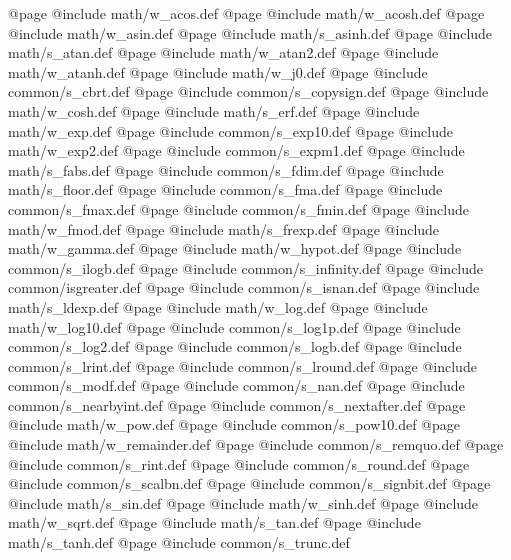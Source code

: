 @page
@include   math/w_acos.def
@page
@include   math/w_acosh.def
@page
@include   math/w_asin.def
@page
@include   math/s_asinh.def
@page
@include   math/s_atan.def
@page
@include   math/w_atan2.def
@page
@include   math/w_atanh.def
@page
@include   math/w_j0.def
@page
@include common/s_cbrt.def
@page
@include common/s_copysign.def
@page
@include   math/w_cosh.def
@page
@include   math/s_erf.def
@page
@include   math/w_exp.def
@page
@include   common/s_exp10.def
@page
@include   math/w_exp2.def
@page
@include common/s_expm1.def
@page
@include   math/s_fabs.def
@page
@include common/s_fdim.def
@page
@include   math/s_floor.def
@page
@include common/s_fma.def
@page
@include common/s_fmax.def
@page
@include common/s_fmin.def
@page
@include   math/w_fmod.def
@page
@include   math/s_frexp.def
@page
@include   math/w_gamma.def
@page
@include   math/w_hypot.def
@page
@include common/s_ilogb.def
@page
@include common/s_infinity.def
@page
@include   common/isgreater.def
@page
@include common/s_isnan.def
@page
@include   math/s_ldexp.def
@page
@include   math/w_log.def
@page
@include   math/w_log10.def
@page
@include common/s_log1p.def
@page
@include common/s_log2.def
@page
@include common/s_logb.def
@page
@include common/s_lrint.def
@page
@include common/s_lround.def
@page
@include common/s_modf.def
@page
@include common/s_nan.def
@page
@include common/s_nearbyint.def
@page
@include common/s_nextafter.def
@page
@include   math/w_pow.def
@page
@include   common/s_pow10.def
@page
@include   math/w_remainder.def
@page
@include common/s_remquo.def
@page
@include common/s_rint.def
@page
@include common/s_round.def
@page
@include common/s_scalbn.def
@page
@include common/s_signbit.def
@page
@include   math/s_sin.def
@page
@include   math/w_sinh.def
@page
@include   math/w_sqrt.def
@page
@include   math/s_tan.def
@page
@include   math/s_tanh.def
@page
@include common/s_trunc.def
